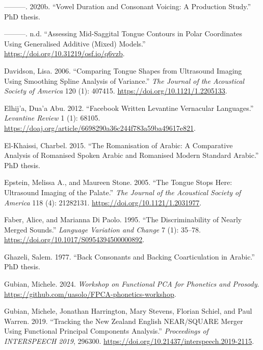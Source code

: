 \documentclass[
]{interact}
\newlength{\cslhangindent}
\newenvironment{CSLReferences}[2] %
 {\begin{list}{}{%
  \setlength{\itemindent}{0pt}
  \setlength{\leftmargin}{0pt}
  \setlength{\parsep}{0pt}
  \ifodd #1
   \setlength{\leftmargin}{\cslhangindent}
   \setlength{\itemindent}{-1\cslhangindent}
  \fi
  \setlength{\itemsep}{#2\baselineskip}}}
 {\end{list}}
\begin{document}
\begin{CSLReferences}{1}{0}
---------. 2020b. {``Vowel Duration and Consonant Voicing: A Production
Study.''} PhD thesis.

---------. n.d. {``Assessing Mid-Saggital Tongue Contours in Polar
Coordinates Using Generalised Additive (Mixed) Models.''}
\url{https://doi.org/10.31219/osf.io/q6vzb}.

Davidson, Lisa. 2006. {``Comparing Tongue Shapes from Ultrasound Imaging
Using Smoothing Spline Analysis of Variance.''} \emph{The Journal of the
Acoustical Society of America} 120 (1): 407415.
\url{https://doi.org/10.1121/1.2205133}.

Elhij'a, Dua'a Abu. 2012. {``Facebook Written Levantine Vernacular
Languages.''} \emph{Levantine Review} 1 (1): 68105.
\url{https://doaj.org/article/6698290a36c244f783a59ba49617e821}.

El-Khaissi, Charbel. 2015. {``The Romanisation of Arabic: A Comparative
Analysis of Romanised Spoken Arabic and Romanised Modern Standard
Arabic.''} PhD thesis.

Epstein, Melissa A., and Maureen Stone. 2005. {``The Tongue Stops Here:
Ultrasound Imaging of the Palate.''} \emph{The Journal of the Acoustical
Society of America} 118 (4): 21282131.
\url{https://doi.org/10.1121/1.2031977}.

Faber, Alice, and Marianna Di Paolo. 1995. {``The Discriminability of
Nearly Merged Sounds.''} \emph{Language Variation and Change} 7 (1):
35--78. \url{https://doi.org/10.1017/S0954394500000892}.

Ghazeli, Salem. 1977. {``Back Consonants and Backing Coarticulation in
Arabic.''} PhD thesis.

Gubian, Michele. 2024. \emph{Workshop on Functional PCA for Phonetics
and Prosody}. \url{https://github.com/uasolo/FPCA-phonetics-workshop}.

Gubian, Michele, Jonathan Harrington, Mary Stevens, Florian Schiel, and
Paul Warren. 2019. {``Tracking the New Zealand English NEAR/SQUARE
Merger Using Functional Principal Components Analysis.''}
\emph{Proceedings of INTERSPEECH 2019}, 296300.
\url{https://doi.org/10.21437/interspeech.2019-2115}.


\end{CSLReferences}
\end{document}
